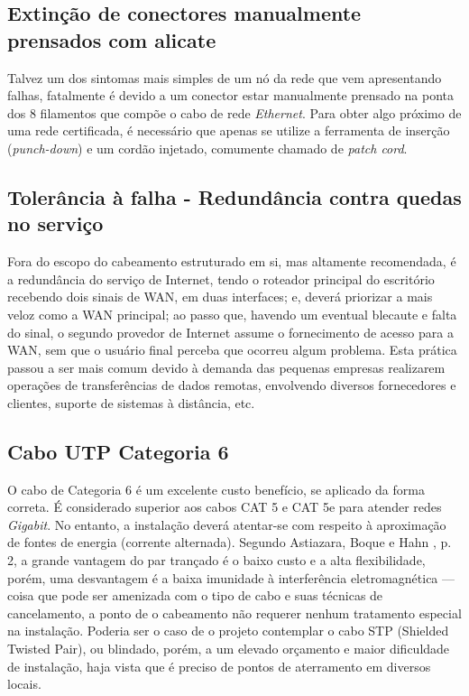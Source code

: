 \documentclass[	DIV=calc,%
							paper=a4,%
							fontsize=12pt,%
							onecolumn]{scrartcl}	 					%
\begin{document}
\subsection{Extinção de conectores manualmente prensados com alicate}
Talvez um dos sintomas mais simples de um nó da rede que vem apresentando falhas, fatalmente é devido a um conector estar manualmente prensado na ponta dos 8 filamentos que compõe o cabo de rede \textit{Ethernet}. Para obter algo próximo de uma rede certificada, é necessário que apenas se utilize a ferramenta de inserção (\textit{punch-down}) e um cordão injetado, comumente chamado de \textit{patch cord}.

\subsection{Tolerância à falha - Redundância contra quedas no serviço}
Fora do escopo do cabeamento estruturado em si, mas altamente recomendada, é a redundância do serviço de Internet, tendo o roteador principal do escritório recebendo dois sinais de WAN, em duas interfaces; e, deverá priorizar a mais veloz como a WAN principal; ao passo que, havendo um eventual blecaute e falta do sinal, o segundo provedor de Internet assume o fornecimento de acesso para a WAN, sem que o usuário final perceba que ocorreu algum problema. Esta prática passou a ser mais comum devido à demanda das pequenas empresas realizarem operações de transferências de dados remotas, envolvendo diversos fornecedores e clientes, suporte de sistemas à distância, etc.

\subsection{Cabo UTP Categoria 6}
O cabo de Categoria 6 é um excelente custo benefício, se aplicado da forma correta. É considerado superior aos cabos CAT 5 e CAT 5e para atender redes \textit{Gigabit}. No entanto, a instalação deverá atentar-se com respeito à aproximação de fontes de energia (corrente alternada). Segundo Astiazara, Boque e Hahn \cite{utp}, p. 2, a grande vantagem do par trançado é o  baixo custo e a alta flexibilidade, porém, uma desvantagem é a baixa imunidade à interferência eletromagnética --- coisa que pode ser amenizada com o tipo de cabo e suas técnicas de cancelamento, a ponto de o cabeamento não requerer nenhum tratamento especial na instalação. Poderia ser o caso de o projeto contemplar o cabo STP (Shielded Twisted Pair), ou blindado, porém, a um elevado orçamento e maior dificuldade de instalação, haja vista que é preciso de pontos de aterramento em diversos locais. 
\end{document}
